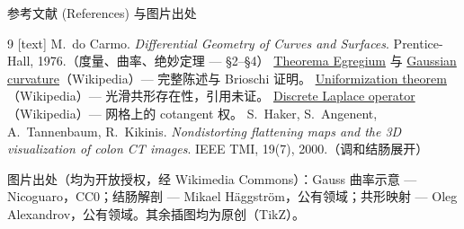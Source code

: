 \documentclass[aspectratio=169,10pt]{beamer}
\begin{document}
\begin{frame}{参考文献 (References) 与图片出处}
  \footnotesize
  \begin{thebibliography}{9}
    [text]
     M.~do Carmo. \emph{Differential Geometry of Curves and Surfaces}. Prentice-Hall, 1976.（度量、曲率、绝妙定理 --- \S2--\S4）
     \href{https://en.wikipedia.org/wiki/Theorema_Egregium}{Theorema Egregium} 与 \href{https://en.wikipedia.org/wiki/Gaussian_curvature}{Gaussian curvature}（Wikipedia）--- 完整陈述与 Brioschi 证明。
     \href{https://en.wikipedia.org/wiki/Uniformization_theorem}{Uniformization theorem}（Wikipedia）--- 光滑共形存在性，引用未证。
     \href{https://en.wikipedia.org/wiki/Discrete_Laplace_operator}{Discrete Laplace operator}（Wikipedia）--- 网格上的 cotangent 权。
     S.~Haker, S.~Angenent, A.~Tannenbaum, R.~Kikinis. \emph{Nondistorting flattening maps and the 3D visualization of colon CT images}. IEEE TMI, 19(7), 2000.（调和结肠展开）
  \end{thebibliography}
  \smallskip
  {\scriptsize 图片出处（均为开放授权，经 Wikimedia Commons）：Gauss 曲率示意 --- Nicoguaro，CC0；结肠解剖 --- Mikael Häggström，公有领域；共形映射 --- Oleg Alexandrov，公有领域。其余插图均为原创（TikZ）。}
\end{frame}
\end{document}
